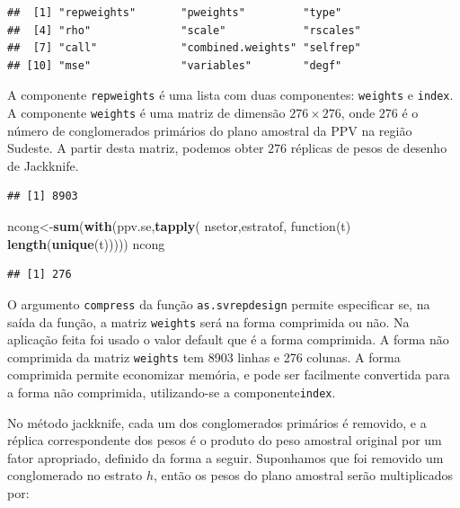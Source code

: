 \documentclass[]{book}
\newenvironment{Shaded}{\begin{snugshade}}{\end{snugshade}}
\newcommand{\KeywordTok}[1]{\textcolor[rgb]{0.13,0.29,0.53}{\textbf{{#1}}}}
\newcommand{\NormalTok}[1]{{#1}}
\numberwithin{example}{chapter}
\numberwithin{remark}{chapter}
\numberwithin{definition}{chapter}
\begin{document}
\begin{verbatim}
##  [1] "repweights"       "pweights"         "type"            
##  [4] "rho"              "scale"            "rscales"         
##  [7] "call"             "combined.weights" "selfrep"         
## [10] "mse"              "variables"        "degf"
\end{verbatim}

A componente \texttt{repweights} é uma lista com duas componentes:
\texttt{weights} e \texttt{index}. A componente \texttt{weights} é uma
matriz de dimensão \(276 \times 276\), onde \(276\) é o número de
conglomerados primários do plano amostral da PPV na região Sudeste. A
partir desta matriz, podemos obter \(276\) réplicas de pesos de desenho
de Jackknife.

\begin{Shaded}
\end{Shaded}

\begin{verbatim}
## [1] 8903
\end{verbatim}

\begin{Shaded}
\begin{Highlighting}[]
\NormalTok{ncong<-}\KeywordTok{sum}\NormalTok{(}\KeywordTok{with}\NormalTok{(ppv.se,}\KeywordTok{tapply}\NormalTok{( nsetor,estratof, function(t) }\KeywordTok{length}\NormalTok{(}\KeywordTok{unique}\NormalTok{(t)))))}
\NormalTok{ncong}
\end{Highlighting}
\end{Shaded}

\begin{verbatim}
## [1] 276
\end{verbatim}

O argumento \texttt{compress} da função \texttt{as.svrepdesign} permite
especificar se, na saída da função, a matriz \texttt{weights} será na
forma comprimida ou não. Na aplicação feita foi usado o valor default
que é a forma comprimida. A forma não comprimida da matriz
\texttt{weights} tem 8903 linhas e 276 colunas. A forma comprimida
permite economizar memória, e pode ser facilmente convertida para a
forma não comprimida, utilizando-se a componente\texttt{index}.

No método jackknife, cada um dos conglomerados primários é removido, e a
réplica correspondente dos pesos é o produto do peso amostral original
por um fator apropriado, definido da forma a seguir. Suponhamos que foi
removido um conglomerado no estrato \(h\), então os pesos do plano
amostral serão multiplicados por:
\end{document}
